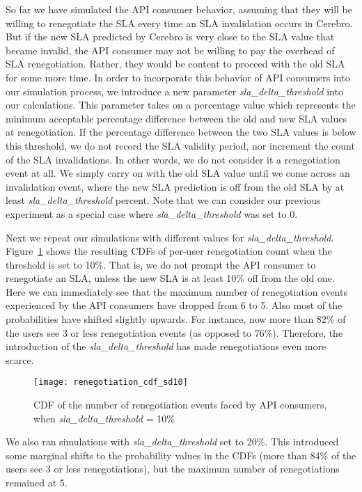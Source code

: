 So far we have simulated the API consumer behavior, assuming that they will be willing to renegotiate the
SLA every time an SLA invalidation occurs in Cerebro. But if the new SLA predicted by Cerebro is very
close to the SLA value that became invalid, the API consumer may not be willing to pay the overhead of
SLA renegotiation. Rather, they would be content to proceed with the old SLA for some more time. In order
to incorporate this behavior of API consumers into our simulation process, we introduce a new parameter 
\textit{sla\_delta\_threshold} into our calculations. This parameter takes on a percentage value which
represents the minimum acceptable percentage difference between the old and new SLA values at renegotiation.
If the percentage difference between the two SLA values is below this threshold, we do not record the
SLA validity period, nor increment the count of the SLA invalidations. In other words, we do not consider
it a renegotiation event at all. We simply carry on with the
old SLA value until we come across an invalidation event, where the new SLA prediction is off from the
old SLA by at least \textit{sla\_delta\_threshold} percent. Note that we can consider our previous experiment
as a special case where \textit{sla\_delta\_threshold} was set to 0.

Next we repeat our simulations with different values for \textit{sla\_delta\_threshold}. Figure~\ref{fig:renegotiation_cdf_sd10}
shows the resulting CDFs of per-user renegotiation count when the threshold is set to 10\%. That is, we 
do not prompt the API consumer to renegotiate an SLA, unless the new SLA is at least 10\% off from the old one.
Here we can immediately see that the maximum number of renegotiation events experienced by the API
consumers have dropped from 6 to 5. Also most of the probabilities have shifted slightly upwards. For instance,
now more than 82\% of the users see 3 or less renegotiation events (as opposed to 76\%). Therefore, the 
introduction of the \textit{sla\_delta\_threshold} has made renegotiations even more scarce.

\begin{figure}
\centering
\texttt{[image: renegotiation\_cdf\_sd10]}
\caption{CDF of the number of renegotiation events faced by API consumers, when  \textit{sla\_delta\_threshold} = 10\%}
\label{fig:renegotiation_cdf_sd10}
\vspace{-0.2in}
\end{figure}

We also ran simulations with \textit{sla\_delta\_threshold} set to 20\%. This introduced some marginal 
shifts to the probability values in the CDFs (more than 84\% of the users see 3 or less renegotiations), 
but the maximum number of renegotiations remained at 5.